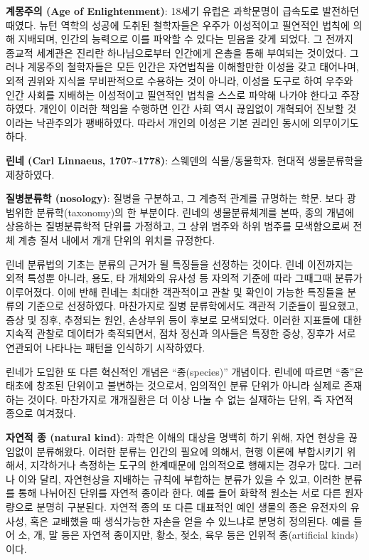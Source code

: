 \documentclass[
]{article}
\begin{document}
\textbf{계몽주의 (Age of Enlightenment)}: 18세기 유럽은 과학문명이
급속도로 발전하던 때였다. 뉴턴 역학의 성공에 도취된 철학자들은 우주가
이성적이고 필연적인 법칙에 의해 지배되며, 인간의 능력으로 이를 파악할 수
있다는 믿음을 갖게 되었다. 그 전까지 종교적 세계관은 진리란
하나님으로부터 인간에게 은총을 통해 부여되는 것이었다. 그러나 계몽주의
철학자들은 모든 인간은 자연법칙을 이해할만한 이성을 갖고 태어나며, 외적
권위와 지식을 무비판적으로 수용하는 것이 아니라, 이성을 도구로 하여
우주와 인간 사회를 지배하는 이성적이고 필연적인 법칙을 스스로 파악해
나가야 한다고 주장하였다. 개인이 이러한 책임을 수행하면 인간 사회 역시
끊임없이 개혁되어 진보할 것이라는 낙관주의가 팽배하였다. 따라서 개인의
이성은 기본 권리인 동시에 의무이기도 하다.

\textbf{린네 (Carl Linnaeus, 1707\textasciitilde1778)}: 스웨덴의
식물/동물학자. 현대적 생물분류학을 제창하였다.

\textbf{질병분류학 (nosology)}: 질병을 구분하고, 그 계층적 관계를
규명하는 학문. 보다 광범위한 분류학(taxonomy)의 한 부분이다. 린네의
생물분류체계를 본따, 종의 개념에 상응하는 질병분류학적 단위를 가정하고,
그 상위 범주와 하위 범주를 모색함으로써 전체 계층 질서 내에서 개개
단위의 위치를 규정한다.

린네 분류법의 기초는 분류의 근거가 될 특징들을 선정하는 것이다. 린네
이전까지는 외적 특성뿐 아니라, 용도, 타 개체와의 유사성 등 자의적 기준에
따라 그때그때 분류가 이루어졌다. 이에 반해 린네는 최대한 객관적이고 관찰
및 확인이 가능한 특징들을 분류의 기준으로 선정하였다. 마찬가지로 질병
분류학에서도 객관적 기준들이 필요했고, 증상 및 징후, 추정되는 원인,
손상부위 등이 후보로 모색되었다. 이러한 지표들에 대한 지속적 관찰로
데이터가 축적되면서, 점차 정신과 의사들은 특정한 증상, 징후가 서로
연관되어 나타나는 패턴을 인식하기 시작하였다.

린네가 도입한 또 다른 혁신적인 개념은 ``종(species)'' 개념이다. 린네에
따르면 ``종''은 태초에 창조된 단위이고 불변하는 것으로서, 임의적인 분류
단위가 아니라 실제로 존재하는 것이다. 마찬가지로 개개질환은 더 이상 나눌
수 없는 실재하는 단위, 즉 자연적 종으로 여겨졌다.

\textbf{자연적 종 (natural kind)}: 과학은 이해의 대상을 명백히 하기
위해, 자연 현상을 끊임없이 분류해왔다. 이러한 분류는 인간의 필요에
의해서, 현행 이론에 부합시키기 위해서, 지각하거나 측정하는 도구의
한계때문에 임의적으로 행해지는 경우가 많다. 그러나 이와 달리, 자연현상을
지배하는 규칙에 부합하는 분류가 있을 수 있고, 이러한 분류를 통해
나뉘어진 단위를 자연적 종이라 한다. 예를 들어 화학적 원소는 서로 다른
원자량으로 분명히 구분된다. 자연적 종의 또 다른 대표적인 예인 생물의
종은 유전자의 유사성, 혹은 교배했을 때 생식가능한 자손을 얻을 수
있느냐로 분명히 정의된다. 예를 들어 소, 개, 말 등은 자연적 종이지만,
황소, 젖소, 육우 등은 인위적 종(artificial kinds)이다.
\end{document}
